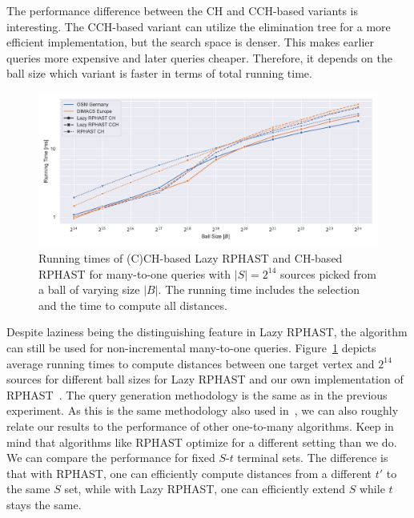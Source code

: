 \documentclass[manuscript]{acmart}
\begin{document}
The performance difference between the CH and CCH-based variants is interesting.
The CCH-based variant can utilize the elimination tree for a more efficient implementation, but the search space is denser.
This makes earlier queries more expensive and later queries cheaper.
Therefore, it depends on the ball size which variant is faster in terms of total running time.

\begin{figure}
\centering
\includegraphics[width=\linewidth]{fig/lazy_rphast_many_to_one_both.pdf}
\caption{
Running times of (C)CH-based Lazy RPHAST and CH-based RPHAST for many-to-one queries with $|S| = 2^{14}$ sources picked from a ball of varying size $|B|$.
The running time includes the selection and the time to compute all distances.
}\label{fig:many_to_one}
\end{figure}

Despite laziness being the distinguishing feature in Lazy RPHAST, the algorithm can still be used for non-incremental many-to-one queries.
Figure~\ref{fig:many_to_one} depicts average running times to compute distances between one target vertex and $2^{14}$ sources for different ball sizes for Lazy RPHAST and our own implementation of RPHAST~\cite{delling_et_al:OASIcs:2011:3266}.
The query generation methodology is the same as in the previous experiment.
As this is the same methodology also used in~\cite{delling_et_al:OASIcs:2011:3266}, we can also roughly relate our results to the performance of other one-to-many algorithms.
Keep in mind that algorithms like RPHAST optimize for a different setting than we do.
We can compare the performance for fixed $S$-$t$ terminal sets.
The difference is that with RPHAST, one can efficiently compute distances from a different $t'$ to the same $S$ set, while with Lazy RPHAST, one can efficiently extend $S$ while $t$ stays the same.
\end{document}
